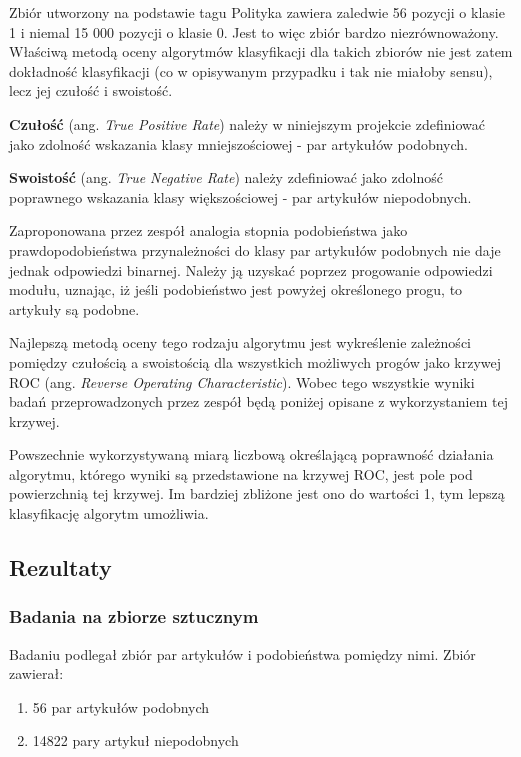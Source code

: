\par Zbiór utworzony na podstawie tagu Polityka zawiera zaledwie 56 pozycji o klasie 1 i niemal 15 000 pozycji o klasie 0. Jest to więc zbiór bardzo niezrównoważony. Właściwą metodą oceny algorytmów klasyfikacji dla takich zbiorów nie jest zatem dokładność klasyfikacji (co w opisywanym przypadku i tak nie miałoby sensu), lecz jej czułość i swoistość.
\par \textbf{Czułość} (ang. \textit{True Positive Rate}) należy w niniejszym projekcie zdefiniować jako zdolność wskazania klasy mniejszościowej - par artykułów podobnych.
\par \textbf{Swoistość} (ang. \textit{True Negative Rate}) należy zdefiniować jako zdolność poprawnego wskazania klasy większościowej - par artykułów niepodobnych.
\par Zaproponowana przez zespół analogia stopnia podobieństwa jako prawdopodobieństwa przynależności do klasy par artykułów podobnych nie daje jednak odpowiedzi binarnej. Należy ją uzyskać poprzez progowanie odpowiedzi modułu, uznając, iż jeśli podobieństwo jest powyżej określonego progu, to artykuły są podobne.
\par Najlepszą metodą oceny tego rodzaju algorytmu jest wykreślenie zależności pomiędzy czułością a swoistością dla wszystkich możliwych progów jako krzywej ROC (ang. \textit{Reverse Operating Characteristic}). Wobec tego wszystkie wyniki badań przeprowadzonych przez zespół będą poniżej opisane z wykorzystaniem tej krzywej.
\par Powszechnie wykorzystywaną miarą liczbową określającą poprawność działania algorytmu, którego wyniki są przedstawione na krzywej ROC, jest pole pod powierzchnią tej krzywej. Im bardziej zbliżone jest ono do wartości 1, tym lepszą klasyfikację algorytm umożliwia.


\subsection{Rezultaty}

\subsubsection{Badania na zbiorze sztucznym}

Badaniu podlegał zbiór par artykułów i podobieństwa pomiędzy nimi. Zbiór zawierał:
\begin{enumerate}
	\item 56 par artykułów podobnych
	\item 14822 pary artykuł niepodobnych
\end{enumerate}

